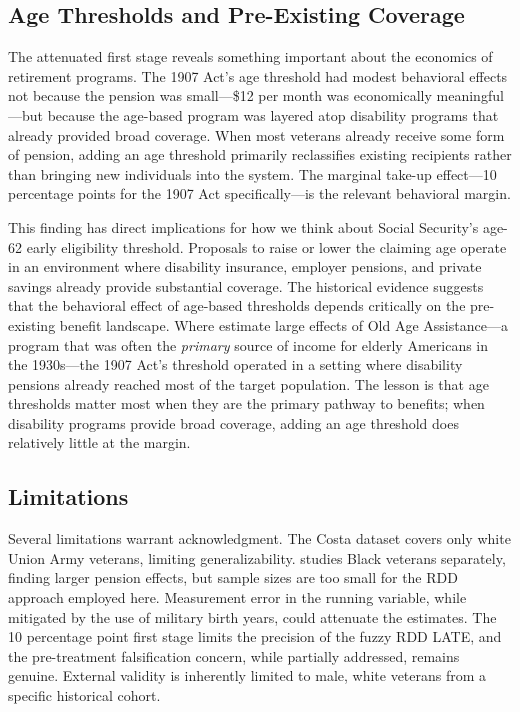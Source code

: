 \documentclass[12pt]{article}
\begin{document}
\subsection{Age Thresholds and Pre-Existing Coverage}

The attenuated first stage reveals something important about the economics of retirement programs. The 1907 Act's age threshold had modest behavioral effects not because the pension was small---\$12 per month was economically meaningful---but because the age-based program was layered atop disability programs that already provided broad coverage. When most veterans already receive some form of pension, adding an age threshold primarily reclassifies existing recipients rather than bringing new individuals into the system. The marginal take-up effect---10 percentage points for the 1907 Act specifically---is the relevant behavioral margin.

This finding has direct implications for how we think about Social Security's age-62 early eligibility threshold. Proposals to raise or lower the claiming age operate in an environment where disability insurance, employer pensions, and private savings already provide substantial coverage. The historical evidence suggests that the behavioral effect of age-based thresholds depends critically on the pre-existing benefit landscape. Where \citet{fetter2018} estimate large effects of Old Age Assistance---a program that was often the \textit{primary} source of income for elderly Americans in the 1930s---the 1907 Act's threshold operated in a setting where disability pensions already reached most of the target population. The lesson is that age thresholds matter most when they are the primary pathway to benefits; when disability programs provide broad coverage, adding an age threshold does relatively little at the margin.

\subsection{Limitations}

Several limitations warrant acknowledgment. The Costa dataset covers only white Union Army veterans, limiting generalizability. \citet{costa1998labor} studies Black veterans separately, finding larger pension effects, but sample sizes are too small for the RDD approach employed here. Measurement error in the running variable, while mitigated by the use of military birth years, could attenuate the estimates. The 10 percentage point first stage limits the precision of the fuzzy RDD LATE, and the pre-treatment falsification concern, while partially addressed, remains genuine. External validity is inherently limited to male, white veterans from a specific historical cohort.
\end{document}
